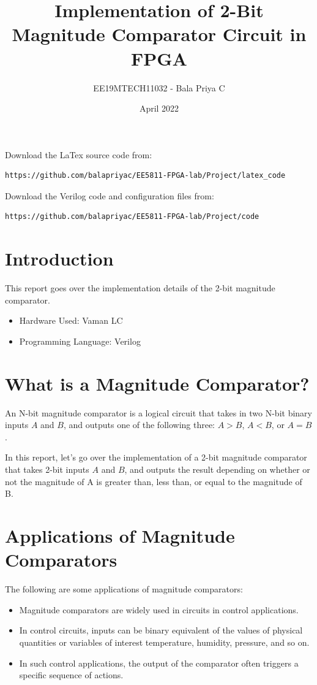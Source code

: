 \documentclass[journal,12pt,twocolumn]{IEEEtran}
\title{Implementation of 2-Bit Magnitude Comparator Circuit in FPGA}
\author{EE19MTECH11032 - Bala Priya C}
\date{April 2022}
\numberwithin{equation}{section}
\begin{document}
\maketitle
Download the LaTex source code from:
\begin{lstlisting}
https://github.com/balapriyac/EE5811-FPGA-lab/Project/latex_code
\end{lstlisting}
Download the Verilog code and configuration files from:
\begin{lstlisting}
https://github.com/balapriyac/EE5811-FPGA-lab/Project/code
\end{lstlisting}

\section{Introduction}
This report goes over the implementation details of the 2-bit magnitude comparator.\\
\begin{itemize}
    \item Hardware Used: Vaman LC
    \item Programming Language: Verilog
\end{itemize}

\section{What is a Magnitude Comparator?}
An N-bit magnitude comparator is a logical circuit that takes in two N-bit binary inputs $A$ and $B$, and outputs one of the following three: $A > B$, $A < B$, or $A = B$.

In this report, let's go over the implementation of a 2-bit magnitude comparator that takes 2-bit inputs $A$ and $B$, and outputs the result depending on whether or not the magnitude of A is greater than, less than, or equal to the magnitude of B. 

\section{Applications of Magnitude Comparators}
The following are some applications of magnitude comparators:
\begin{itemize}
    \item Magnitude comparators are widely used in circuits in control applications.
    \item In control circuits, inputs can be binary equivalent of the values of physical quantities or variables of interest temperature, humidity, pressure, and so on.
    \item In such control applications, the output of the comparator often triggers a specific sequence of actions.
    
\end{itemize}
\end{document}
